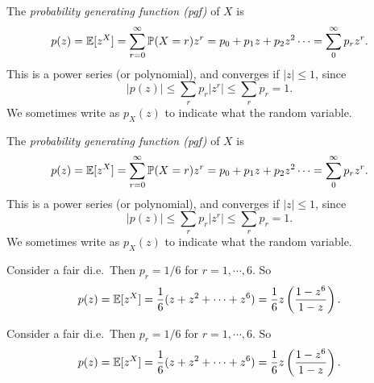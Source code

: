 \begin{note}
  \begin{field}
    \begin{defi}
      The \emph{probability generating function (pgf)} of $X$ is
      \[
        p(z) = \mathbb{E}[z^X] = \sum_{r = 0}^\infty \mathbb{P}(X = r)z^r = p_0 + p_1z + p_2z^2\cdots = \sum_0^\infty p_rz^r.
      \]
      This is a power series (or polynomial), and converges if $|z| \leq 1$, since
      \[
        |p(z)| \leq \sum_r p_r |z^r| \leq \sum_r p_r = 1.
      \]
      We sometimes write as $p_X(z)$ to indicate what the random variable.
    \end{defi}
  \end{field}
  \begin{field}
    \begin{defi}
      The \emph{probability generating function (pgf)} of $X$ is
      \[
        p(z) = \mathbb{E}[z^X] = \sum_{r = 0}^\infty \mathbb{P}(X = r)z^r = p_0 + p_1z + p_2z^2\cdots = \sum_0^\infty p_rz^r.
      \]
      This is a power series (or polynomial), and converges if $|z| \leq 1$, since
      \[
        |p(z)| \leq \sum_r p_r |z^r| \leq \sum_r p_r = 1.
      \]
      We sometimes write as $p_X(z)$ to indicate what the random variable.
    \end{defi}
  \end{field}
  \xplain{}%
\end{note}

\begin{note}
  \begin{field}
    \begin{eg}
      Consider a fair di.e.\ Then $p_r = 1/6$ for $r = 1, \cdots, 6$. So
      \[
        p(z) = \mathbb{E}[z^X] = \frac{1}{6}(z + z^2 + \cdots + z^6) = \frac{1}{6}z\left(\frac{1 - z^6}{1 - z}\right).
      \]
    \end{eg}
  \end{field}
  \begin{field}
    \begin{eg}
      Consider a fair di.e.\ Then $p_r = 1/6$ for $r = 1, \cdots, 6$. So
      \[
        p(z) = \mathbb{E}[z^X] = \frac{1}{6}(z + z^2 + \cdots + z^6) = \frac{1}{6}z\left(\frac{1 - z^6}{1 - z}\right).
      \]
    \end{eg}
  \end{field}
  \xplain{}%
\end{note}

